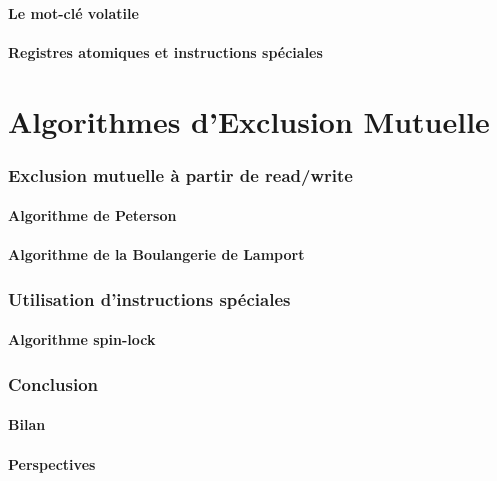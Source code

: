 \documentclass[9pt, handout]{beamer}
\begin{document}
\subsection{Le mot-clé volatile}


 
\subsection{Registres atomiques et instructions spéciales}



 
 
 
\part{Algorithmes d'Exclusion Mutuelle}
 
 
\section{Exclusion mutuelle à partir de read/write}
 
\subsection{Algorithme de Peterson}





 
\subsection{Algorithme de la Boulangerie de Lamport}


 
\section{Utilisation d'instructions spéciales}
 
\subsection{Algorithme spin-lock}
  
 
 
\section{Conclusion}
 
\subsection{Bilan}

 
\subsection{Perspectives}


\end{document}
